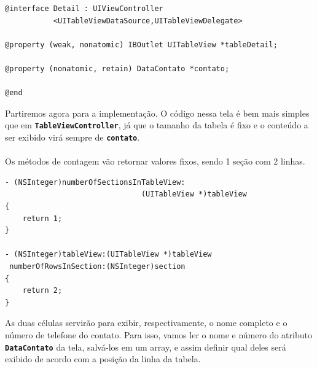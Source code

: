 \documentclass[a4paper,12pt,brazil,doubleside]{book}
\begin{document}
\begin{listing}
\begin{verbatim}
@interface Detail : UIViewController
           <UITableViewDataSource,UITableViewDelegate>

@property (weak, nonatomic) IBOutlet UITableView *tableDetail;

@property (nonatomic, retain) DataContato *contato;

@end
\end{verbatim}
\end{listing}

Partiremos agora para a implementação. O código nessa tela é bem mais simples que em \texttt{\textbf{TableViewController}}, já que o tamanho da tabela é fixo e o conteúdo a ser exibido virá sempre de \texttt{\textbf{contato}}.
\paragraph{}Os métodos de contagem vão retornar valores fixos, sendo 1 seção com 2 linhas.

\begin{listing}
\begin{verbatim}
- (NSInteger)numberOfSectionsInTableView:
                               (UITableView *)tableView
{        
    return 1;
}

- (NSInteger)tableView:(UITableView *)tableView
 numberOfRowsInSection:(NSInteger)section
{
    return 2;
}
\end{verbatim}
\end{listing}

As duas células servirão para exibir, respectivamente, o nome completo e o número de telefone do contato. Para isso, vamos ler o nome e número do atributo \texttt{\textbf{DataContato}} da tela, salvá-los em um array, e assim definir qual deles será exibido de acordo com a posição da linha da tabela.

\pagebreak
\end{document}
